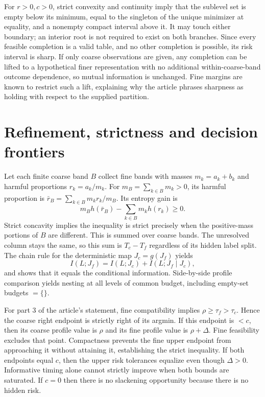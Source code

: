 For $r>0,c>0$, strict convexity and continuity imply that the sublevel set is empty below its minimum, equal to the singleton of the unique minimizer at equality, and a nonempty compact interval above it. It may touch either boundary; an interior root is not required to exist on both branches. Since every feasible completion is a valid table, and no other completion is possible, its risk interval is sharp. If only coarse observations are given, any completion can be lifted to a hypothetical finer representation with no additional within-coarse-band outcome dependence, so mutual information is unchanged. Fine margins are known to restrict such a lift, explaining why the article phrases sharpness as holding with respect to the supplied partition.

\section{Refinement, strictness and decision frontiers}
Let each finite coarse band $B$ collect fine bands with masses $m_k=a_k+b_k$ and harmful proportions $r_k=a_k/m_k$. For $m_B=\sum_{k\in B}m_k>0$, its harmful proportion is $\bar r_B=\sum_{k\in B}m_kr_k/m_B$. Its entropy gain is
\begin{equation}
 m_Bh(\bar r_B)-\sum_{k\in B}m_kh(r_k)\ge0.
\end{equation}
Strict concavity implies the inequality is strict precisely when the positive-mass portions of $B$ are different. This is summed over coarse bands. The unresolved column stays the same, so this sum is $T_c-T_f$ regardless of its hidden label split. The chain rule for the deterministic map $J_c=g(J_f)$ yields
\begin{equation}
 I(L;J_f)=I(L;J_c)+I(L;J_f\mid J_c),
\end{equation}
and shows that it equals the conditional information. Side-by-side profile comparison yields nesting at all levels of common budget, including empty-set budgets $=\{\}$.

For part 3 of the article's statement, fine compatibility implies $\rho\ge\tau_f>\tau_c$. Hence the coarse right endpoint is strictly right of its argmin. If this endpoint is $<c$, then its coarse profile value is $\rho$ and its fine profile value is $\rho+\Delta$. Fine feasibility excludes that point. Compactness prevents the fine upper endpoint from approaching it without attaining it, establishing the strict inequality. If both endpoints equal $c$, then the upper risk tolerances equalize even though $\Delta>0$. Informative timing alone cannot strictly improve when both bounds are saturated. If $c=0$ then there is no slackening opportunity because there is no hidden risk.

